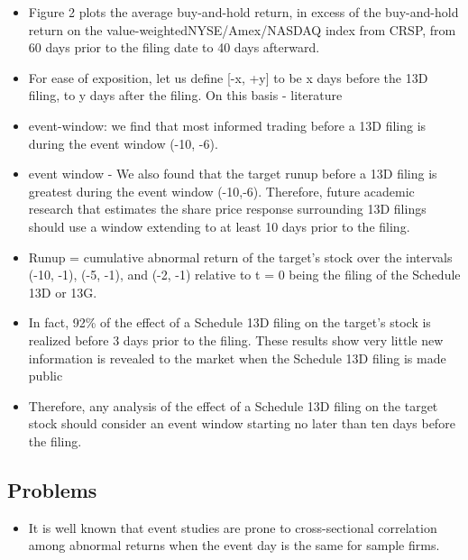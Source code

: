 \documentclass[12pt]{article}
\begin{document}
    \begin{itemize}

        \item Figure 2 plots the average buy-and-hold return, in excess of the buy-and-hold return on the value-weightedNYSE/Amex/NASDAQ index from CRSP, from 60 days prior to the filing date to 40 days afterward.\citep{Collin-Dufresne2015}

        \item For ease of exposition, let us define [-x, +y] to be x days before the 13D filing, to y days after the filing. On this basis - literature \citep{CoffeeJr.2014}

        \item event-window: we find that most informed trading before a 13D filing is during the event window (-10, -6).\citep{Brigida2012}


        \item event window - We also found that the target runup before a 13D filing is greatest during the event window (-10,-6). Therefore, future academic research that estimates the share price response surrounding 13D filings should use a window extending to at least 10 days prior to the filing. \citep{Brigida2012}

        \item Runup = cumulative abnormal return of the target’s stock over the intervals (-10, -1), (-5, -1), and (-2, -1) relative to t = 0 being the filing of the Schedule 13D or 13G. \citep{Brigida2012}
        
        \item In fact, 92\% of the effect of a Schedule 13D filing on the target’s stock is realized before 3 days prior to the filing. These results show very little new information is revealed to the market when the Schedule 13D filing is made public \citep{Brigida2012}

        \item Therefore, any analysis of the effect of a Schedule 13D filing on the target stock should consider an event window starting no later than ten days before the filing. \citep{Brigida2012}

    \end{itemize}

\subsection{Problems}

    \begin{itemize}

        \item It is well known that event studies are prone to cross-sectional correlation among abnormal returns when the event day is the same for sample firms. \citep{Kolari2010}


    \end{itemize}
\end{document}
